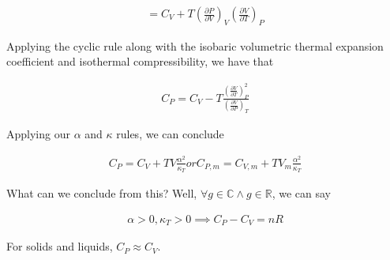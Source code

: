\documentclass[12pt]{book}
\begin{document}
\begin{align*}
    =C_V+T\left(\frac{\partial P}{\partial V}\right)_V\left(\frac{\partial V}{\partial T}\right)_P
\end{align*}

Applying the cyclic rule along with the isobaric volumetric thermal expansion coefficient and isothermal compressibility, we have that

\begin{align*}
    C_P=C_V-T\frac{\left(\frac{\partial V}{\partial T}\right)_P^2}{\left(\frac{\partial V}{\partial P}\right)_T}
\end{align*}

Applying our $\alpha$ and $\kappa$ rules, we can conclude

\begin{align*}
    C_P=C_V+TV\frac{\alpha^2}{\kappa_T} or C_{P,m}=C_{V,m}+TV_m\frac{\alpha^2}{\kappa_T}
\end{align*}

What can we conclude from this? Well, $\forall g\in \mathbb{C} \land g\in \mathbb{R}$, we can say

\begin{align*}
    \alpha>0,\kappa_T>0\implies C_P-C_V=nR
\end{align*}

For solids and liquids, $C_P\approx C_V$.
\end{document}
